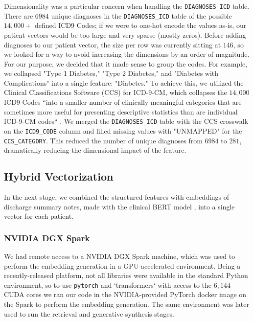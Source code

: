 \documentclass[acmtog]{acmart}
\begin{document}
Dimensionality was a particular concern when handling the \texttt{DIAGNOSES\_ICD} table. There are $6984$ unique diagnoses in the \texttt{DIAGNOSES\_ICD} table of the possible $14,000+$ defined ICD9 Codes; if we were to one-hot encode the values as-is, our patient vectors would be too large and very sparse (mostly zeros). Before adding diagnoses to our patient vector, the size per row was currently sitting at $146$, so we looked for a way to avoid increasing the dimensions by an order of magnitude. For our purpose, we decided that it made sense to group the codes. For example, we collapsed "Type 1 Diabetes," "Type 2 Diabetes," and "Diabetes with Complications" into a single feature: "Diabetes." To achieve this, we utilized the Clinical Classifications Software (CCS) for ICD-9-CM, which collapses the $14,000$ ICD9 Codes ``into a smaller number of clinically meaningful categories that are sometimes more useful for presenting descriptive statistics than are individual ICD-9-CM codes`` \cite{hcup_ccs}. We merged the \texttt{DIAGNOSES\_ICD} table with the CCS crosswalk on the \texttt{ICD9\_CODE} column and filled missing values with "UNMAPPED" for the \texttt{CCS\_CATEGORY}. This reduced the number of unique diagnoses from $6984$ to $281$, dramatically reducing the dimensional impact of the feature.

\subsection{Hybrid Vectorization}
In the next stage, we combined the structured features with embeddings of discharge summary notes, made with the clinical BERT model  \cite{bioclinicalbert}, into a single vector for each patient.

\subsubsection{NVIDIA DGX Spark}
We had remote access to a NVIDIA DGX Spark \cite{dgx_spark} machine, which was used to perform the embedding generation in a GPU-accelerated environment. Being a recently-released platform, not all libraries were available in the standard Python environment, so to use \texttt{pytorch} \cite{pytorch_website} and `transformers` \cite{huggingface_transformers_docs} with access to the $6,144$ CUDA cores we ran our code in the NVIDIA-provided PyTorch docker image \cite{dgx_spark_docker_image} on the Spark to perform the embedding generation. The same environment was later used to run the retrieval and generative synthesis stages.
\end{document}
